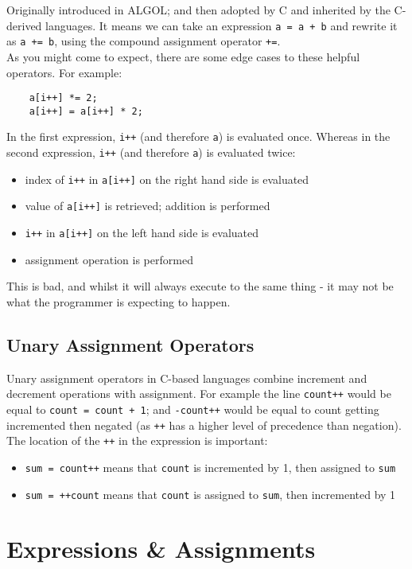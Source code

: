 Originally introduced in ALGOL; and then adopted by C and inherited by the C-derived languages. It means we can take an expression \verb|a = a + b| and rewrite it as \verb|a += b|, using the compound assignment operator \verb|+=|.\\

As you might come to expect, there are some edge cases to these helpful operators. For example:
\begin{verbatim}
    a[i++] *= 2;
    a[i++] = a[i++] * 2;
\end{verbatim}
In the first expression, \verb|i++| (and therefore \verb|a|) is evaluated once. Whereas in the second expression, \verb|i++| (and therefore \verb|a|) is evaluated twice:
\begin{itemize}
    \item index of \verb|i++| in \verb|a[i++]| on the right hand side is evaluated
    \item value of \verb|a[i++]| is retrieved; addition is performed
    \item \verb|i++| in \verb|a[i++]| on the left hand side is evaluated
    \item assignment operation is performed
\end{itemize}
This is bad, and whilst it will always execute to the same thing - it may not be what the programmer is expecting to happen. 

\subsection{Unary Assignment Operators}
Unary assignment operators in C-based languages combine increment and decrement operations with assignment. For example the line \verb|count++| would be equal to \verb|count = count + 1|; and \verb|-count++| would be equal to count getting incremented then negated (as \verb|++| has a higher level of precedence than negation). \\

The location of the \verb|++| in the expression is important:
\begin{itemize}
    \item \verb|sum = count++| means that \verb|count| is incremented by 1, then assigned to \verb|sum|
    \item \verb|sum = ++count| means that \verb|count| is assigned to \verb|sum|, then incremented by 1
\end{itemize}



\section{Expressions \& Assignments}

